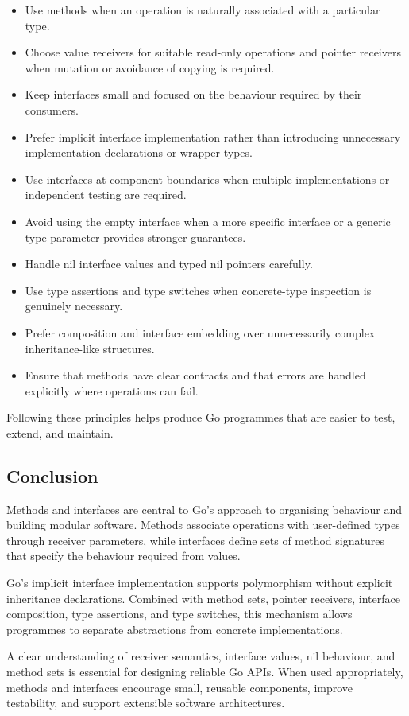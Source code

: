 \begin{itemize}
    \item Use methods when an operation is naturally associated with a particular type.
    \item Choose value receivers for suitable read-only operations and pointer receivers when mutation or avoidance of copying is required.
    \item Keep interfaces small and focused on the behaviour required by their consumers.
    \item Prefer implicit interface implementation rather than introducing unnecessary implementation declarations or wrapper types.
    \item Use interfaces at component boundaries when multiple implementations or independent testing are required.
    \item Avoid using the empty interface when a more specific interface or a generic type parameter provides stronger guarantees.
    \item Handle nil interface values and typed nil pointers carefully.
    \item Use type assertions and type switches when concrete-type inspection is genuinely necessary.
    \item Prefer composition and interface embedding over unnecessarily complex inheritance-like structures.
    \item Ensure that methods have clear contracts and that errors are handled explicitly where operations can fail.
\end{itemize}

Following these principles helps produce Go programmes that are easier to test, extend, and maintain.

\subsection{Conclusion}

Methods and interfaces are central to Go's approach to organising behaviour and building modular software. Methods associate operations with user-defined types through receiver parameters, while interfaces define sets of method signatures that specify the behaviour required from values.

Go's implicit interface implementation supports polymorphism without explicit inheritance declarations. Combined with method sets, pointer receivers, interface composition, type assertions, and type switches, this mechanism allows programmes to separate abstractions from concrete implementations.

A clear understanding of receiver semantics, interface values, nil behaviour, and method sets is essential for designing reliable Go APIs. When used appropriately, methods and interfaces encourage small, reusable components, improve testability, and support extensible software architectures.

